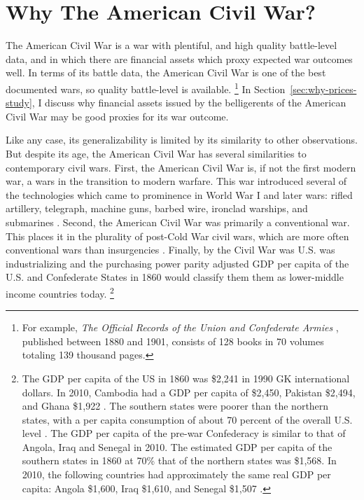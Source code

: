 \section{Why The American Civil War?}
\label{sec:why-american-civil}

The American Civil War is a war with plentiful, and high quality battle-level data, and in which there are financial assets which proxy expected war outcomes well.
In terms of its battle data, the American Civil War is one of the best documented wars, so quality battle-level is available.%
\footnote{%
  For example, \textit{The Official Records of the Union and  Confederate Armies} \parencites{US1901}, published between 1880 and 1901, consists of 128 books in 70 volumes totaling 139 thousand pages.

} %
In Section~\ref{sec:why-prices-study}, I discuss why financial assets issued by the belligerents of the American Civil War may be good proxies for its war outcome.

Like any case, its generalizability is limited by its similarity to other observations.
But despite its age, the American Civil War has several similarities to contemporary civil wars.
First, the American Civil War is, if not the first modern war, a wars in the transition to modern warfare.
This war introduced several of the technologies which came to prominence in World War I and later wars: rifled artillery, telegraph, machine guns, barbed wire, ironclad warships, and submarines \parencites[89][]{Fuller1956a}[760]{Weiss1966}.
Second, the American Civil War was primarily a conventional war.
This places it in the plurality of post-Cold War civil wars, which are more often conventional wars than insurgencies \parencite[423]{kalyvas2010inter}.%
Finally, by the Civil War was U.S. was industrializing and the purchasing power parity adjusted GDP per capita of the U.S. and Confederate States in 1860 would classify them them as lower-middle income countries today.%
\footnote{%
  The GDP per capita of the US in 1860 was \$2,241 in 1990 GK international dollars. %
  In 2010, Cambodia had a GDP per capita of \$2,450, Pakistan \$2,494, and Ghana \$1,922 \parencite{BoltZanden2013}. %
  The southern states were poorer than the northern states, with a per capita consumption of about 70 percent of the overall U.S. level \parencite[324]{GoldinLewis1975}.
  The GDP per capita of the pre-war Confederacy is similar to that of Angola, Iraq and Senegal in 2010.%
  The estimated GDP per capita of the southern states in 1860 at 70\% that of the northern states was \$1,568. %
  In 2010, the following countries had approximately the same real GDP per capita: Angola \$1,600, Iraq \$1,610, and Senegal \$1,507 \parencite{BoltZanden2013}. %
}

